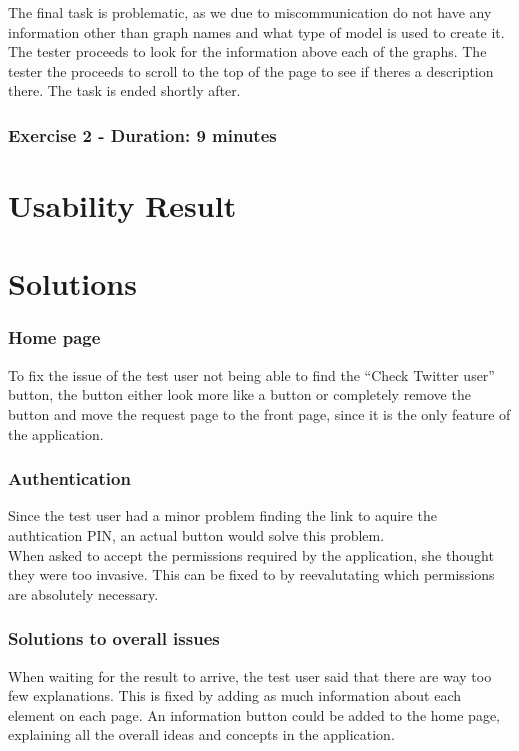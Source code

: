 The final task is problematic, as we due to miscommunication do not have any
information other than graph names and what type of model is used to create it.
The tester proceeds to look for the information above each of the graphs. The
tester the proceeds to scroll to the top of the page to see if theres a
description there. The task is ended shortly after.

\subsubsection{Exercise 2 - Duration: 9 minutes}





\section{Usability Result}\label{sec:UXUR}


\section{Solutions}

\subsubsection{Home page}
To fix the issue of the test user not being able to find the ``Check Twitter
user'' button, the button either look more like a button or completely remove
the button and move the request page to the front page, since it is the only
feature of the application.

\subsubsection{Authentication}
Since the test user had a minor problem finding the link to aquire the
authtication PIN, an actual button would solve this problem.\\
When asked to accept the permissions required by the application, she thought
they were too invasive. This can be fixed to by reevalutating which permissions
are absolutely necessary.

\subsubsection{Solutions to overall issues}
When waiting for the result to arrive, the test user said that there are way too
few explanations. This is fixed by adding as much information about each element
on each page. An information button could be added to the home page, explaining
all the overall ideas and concepts in the application.

